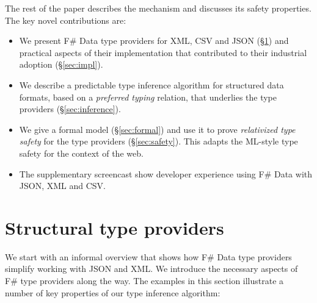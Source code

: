 \documentclass[10pt,preprint,blind,clearpagebib]{sigplanconf}
\begin{document}
The rest of the paper describes the mechanism and discusses its safety properties. 
The key novel contributions are:

\begin{itemize}
\item We present F\# Data type providers for XML, CSV and JSON (\S\ref{sec:providers}) 
  and practical aspects of their implementation that contributed to their industrial 
  adoption (\S\ref{sec:impl}). 

\item We describe a predictable type inference algorithm for structured data formats, 
  based on a \emph{preferred typing} relation, that underlies the type providers 
  (\S\ref{sec:inference}).

\item We give a formal model (\S\ref{sec:formal}) and use it to prove
  \emph{relativized type safety} for the type providers (\S\ref{sec:safety}).
  This adapts the ML-style type safety for the context of the web.

\item The supplementary screencast show developer experience using 
  F\# Data with JSON, XML and CSV.
\end{itemize}


%
%

\section{Structural type providers}
\label{sec:providers}

We start with an informal overview that shows how F\# Data type providers simplify working with 
JSON and XML. We introduce the necessary aspects of F\# type providers along the 
way. The examples in this section illustrate a number of key properties of our type inference 
algorithm:
\end{document}
